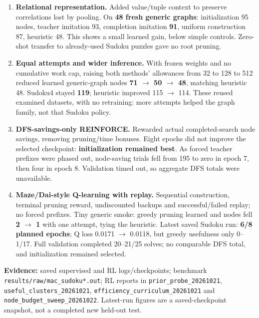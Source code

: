 \documentclass[10pt,a4paper]{article}
\begin{document}
\begin{enumerate}
\item \textbf{Relational representation.} Added value/tuple context to preserve correlations lost by pooling. On \textbf{48 fresh generic graphs}: initialization 95 nodes, teacher imitation 93, completion imitation \textbf{91}, uniform construction 87, heuristic 48. This shows a small learned gain, below simple controls. Zero-shot transfer to already-used Sudoku puzzles gave no root pruning.

\item \textbf{Equal attempts and wider inference.} With frozen weights and no cumulative work cap, raising both methods' allowances from 32 to 128 to 512 reduced learned generic-graph nodes \textbf{71 $\rightarrow$ 50 $\rightarrow$ 48}, matching heuristic 48. Sudoku4 stayed \textbf{119}; heuristic improved 115 $\rightarrow$ 114. These reused examined datasets, with no retraining: more attempts helped the graph family, not that Sudoku policy.

\item \textbf{DFS-savings-only REINFORCE.} Rewarded actual completed-search node savings, removing pruning/time bonuses. Eight epochs did not improve the selected checkpoint: \textbf{initialization remained best}. As forced teacher prefixes were phased out, node-saving trials fell from 195 to zero in epoch 7, then four in epoch 8. Validation timed out, so aggregate DFS totals were unavailable.

\item \textbf{Maze/Dai-style Q-learning with replay.} Sequential construction, terminal pruning reward, undiscounted backups and successful/failed replay; no forced prefixes. Tiny generic smoke: greedy pruning learned and nodes fell \textbf{2 $\rightarrow$ 1} with one attempt, tying the heuristic. Latest saved Sudoku run: \textbf{6/8 planned epochs}; Q loss 0.0171 $\rightarrow$ 0.0118, but greedy usefulness only 0--1/17. Full validation completed 20--21/25 solves; no comparable DFS total, and initialization remained selected.
\end{enumerate}

\vfill
{\footnotesize\raggedright\color{muted}\textbf{Evidence:} saved supervised and RL logs/checkpoints; benchmark \texttt{results/raw/mac\_sudoku*.out}; RL reports in \texttt{prior\_probe\_20261021}, \texttt{useful\_clusters\_20261021}, \texttt{efficiency\_curriculum\_20261021} and \texttt{node\_budget\_sweep\_20261022}. Latest-run figures are a saved-checkpoint snapshot, not a completed new held-out test.\par}
\end{document}

